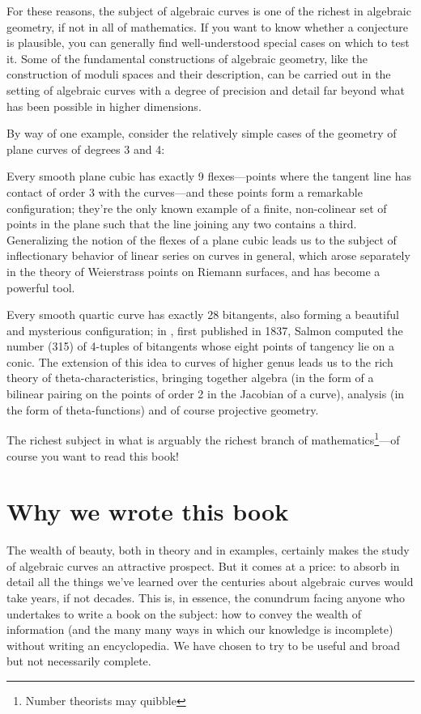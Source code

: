 For these reasons, the subject of algebraic curves is one of the richest in algebraic geometry, if not in all of mathematics. If you want to know whether a conjecture is plausible, you can generally find well-understood special cases on which to test it. Some of the fundamental constructions of algebraic geometry, like the construction of moduli spaces and their description, can be carried out in the setting of algebraic curves with a degree of precision and detail far beyond what has been possible in higher dimensions. 

By way of one example, consider the relatively simple cases of the geometry of plane curves of degrees 3 and 4: 


Every smooth plane cubic has exactly 9 flexes---points where the tangent line has contact of order 3 with the curves---and these points form a remarkable configuration; they're the only known example of a finite, non-colinear set of points in the plane such that the line joining any two contains a third. Generalizing the notion of the flexes of a plane cubic leads us to the subject of inflectionary behavior of linear series on curves in general, which arose separately in the theory of Weierstrass points on Riemann surfaces, and  has become a powerful tool. 

Every smooth quartic curve has exactly 28 bitangents, also forming a beautiful and mysterious configuration;  in \cite{MR0115124}, first published in 1837, Salmon computed the number (315) of 4-tuples of bitangents whose eight points of tangency lie on a conic. The extension of this idea to curves of higher genus leads us to the rich theory of theta-characteristics, bringing together algebra (in the form of a bilinear pairing on the points of order 2 in the Jacobian of a curve), analysis (in the form of theta-functions) and of course projective geometry.

The richest subject in what is arguably the richest branch of mathematics\footnote{Number theorists may quibble}---of course you want to read this book! 

\section{Why we wrote this book}

The wealth of beauty, both in theory and in examples, certainly makes the study of algebraic curves an attractive prospect. But it comes at a price: to absorb in detail all the things we've learned over the centuries about algebraic curves would take years, if not decades. This is, in essence, the conundrum facing anyone who undertakes to write a book on the subject: how to convey the wealth of information  (and the many many ways in which our knowledge is incomplete) without writing an encyclopedia. We have chosen to try to be useful and broad but not necessarily complete. 


